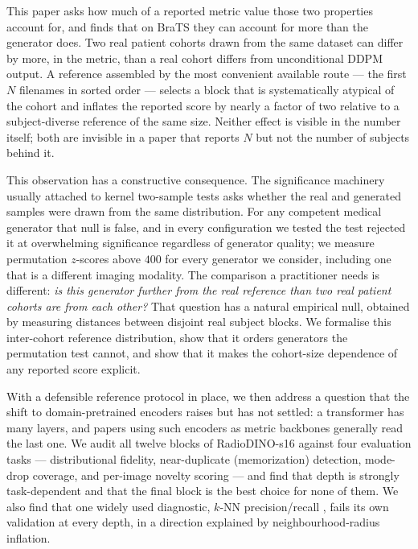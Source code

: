\documentclass[preprint,12pt,authoryear]{elsarticle}
\begin{document}
\noindent This paper asks how much of a reported metric value those two
properties account for, and finds that on BraTS they can account for more than
the generator does. Two real patient cohorts drawn from the same dataset can
differ by more, in the metric, than a real cohort differs from unconditional
DDPM output. A reference assembled by the most convenient available route ---
the first $N$ filenames in sorted order --- selects a block that is
systematically atypical of the cohort and inflates the reported score by nearly
a factor of two relative to a subject-diverse reference of the same size. Neither effect is visible in the
number itself; both are invisible in a paper that reports $N$ but not the number
of subjects behind it.

This observation has a constructive consequence. The significance machinery
usually attached to kernel two-sample tests asks whether the real and generated
samples were drawn from the same distribution. For any competent medical
generator that null is false, and in every configuration we tested the test
rejected it at overwhelming significance regardless of generator quality; we measure
permutation $z$-scores above $400$ for every generator we consider, including
one that is a different imaging modality. The comparison a practitioner needs is
different: \emph{is this generator further from the real reference than two real
patient cohorts are from each other?} That question has a natural empirical
null, obtained by measuring distances between disjoint real subject blocks. We
formalise this inter-cohort reference distribution, show that it orders
generators the permutation test cannot, and show that it makes the cohort-size dependence of
any reported score explicit.

With a defensible reference protocol in place, we then address a question that
the shift to domain-pretrained encoders raises but has not settled: a
transformer has many layers, and papers using such encoders as metric backbones
generally read the last one. We audit all twelve blocks of RadioDINO-s16
\citep{perezrad} against four evaluation tasks --- distributional
fidelity, near-duplicate (memorization) detection, mode-drop coverage, and
per-image novelty scoring --- and find that depth is strongly task-dependent and
that the final block is the best choice for none of them. We also find that one
widely used diagnostic, $k$-NN precision/recall
\citep{kynkaanniemi2019pr}, fails its own validation at every depth, in a
direction explained by neighbourhood-radius inflation.
\end{document}
